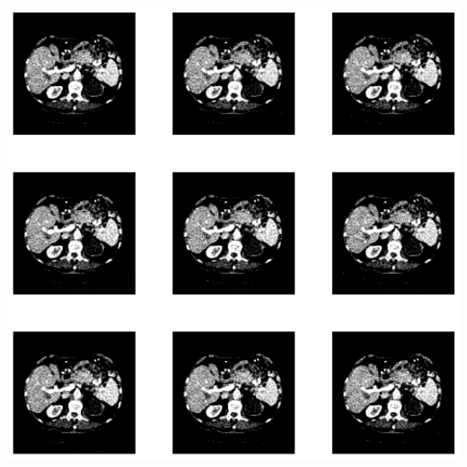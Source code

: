 \documentclass[a4paper, 11pt]{article}
\begin{document}
\begin{center}
\includegraphics[width=.9\linewidth]{./.ob-jupyter/b5966c204c66decb8494e2253ff0c5c519a92527.png}
\end{center}
\end{document}
